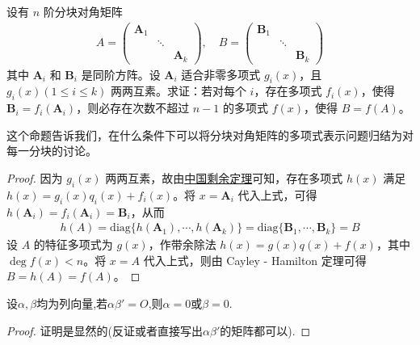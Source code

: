 \documentclass[../../main.tex]{subfiles}%
\begin{document}
\begin{proposition}\label{proposition:可以将分块对角矩阵的多项式表示问题归结为对每一分块的讨论的条件}
设有 $n$ 阶分块对角矩阵
\begin{align*}
A=\begin{pmatrix}
\boldsymbol{A}_1 & & \\
& \ddots & \\
& & \boldsymbol{A}_k
\end{pmatrix}, \quad B=\begin{pmatrix}
\boldsymbol{B}_1 & & \\
& \ddots & \\
& & \boldsymbol{B}_k
\end{pmatrix}
\end{align*}
其中 $\boldsymbol{A}_i$ 和 $\boldsymbol{B}_i$ 是同阶方阵。设 $\boldsymbol{A}_i$ 适合非零多项式 $g_i(x)$，且 $g_i(x) (1\leqslant  i\leqslant  k)$ 两两互素。求证：若对每个 $i$，存在多项式 $f_i(x)$，使得 $\boldsymbol{B}_i = f_i(\boldsymbol{A}_i)$，则必存在次数不超过 $n - 1$ 的多项式 $f(x)$，使得 $B = f(A)$。
\end{proposition}
\begin{note}
这个命题告诉我们，在什么条件下可以将分块对角矩阵的多项式表示问题归结为对每一分块的讨论。
\end{note}
\begin{proof}
因为 $g_i(x)$ 两两互素，故由\hyperref[theorem:中国剩余定理]{中国剩余定理}可知，存在多项式 $h(x)$ 满足 $h(x)=g_i(x)q_i(x)+f_i(x)$。将 $x = \boldsymbol{A}_i$ 代入上式，可得 $h(\boldsymbol{A}_i)=f_i(\boldsymbol{A}_i)=\boldsymbol{B}_i$，从而
\begin{align*}
h(A)=\mathrm{diag}\{h(\boldsymbol{A}_1),\cdots,h(\boldsymbol{A}_k)\}=\mathrm{diag}\{\boldsymbol{B}_1,\cdots,\boldsymbol{B}_k\}=B
\end{align*}
设 $A$ 的特征多项式为 $g(x)$，作带余除法 $h(x)=g(x)q(x)+f(x)$，其中 $\deg f(x)<n$。将 $x = A$ 代入上式，则由 Cayley - Hamilton 定理可得 $B = h(A)=f(A)$。
\end{proof}

\begin{lemma}\label{lemma:向量乘积为零的结论}
设$\alpha,\beta$均为列向量,若$\alpha \beta'=O$,则$\alpha=0$或$\beta=0$.
\end{lemma}
\begin{proof}
证明是显然的(反证或者直接写出$\alpha \beta'$的矩阵都可以).
\end{proof}
\end{document}
